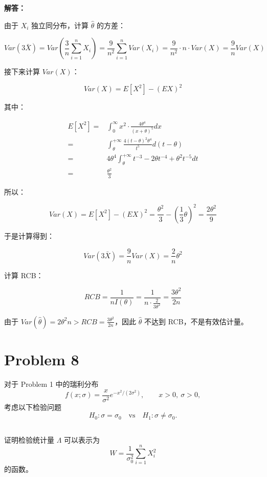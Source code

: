 \documentclass[12pt,a4paper]{article}
\begin{document}
\begin{answerbox}
\textbf{解答：}

由于 $X_i$ 独立同分布，计算 $\hat{\theta}$ 的方差：

$$
Var(3\bar{X}) = Var\left(\frac{3}{n}\sum_{i=1}^{n} X_i\right) = \frac{9}{n^2} \sum_{i=1}^{n} Var(X_i) = \frac{9}{n^2} \cdot n \cdot Var(X) = \frac{9}{n} Var(X)
$$

接下来计算 $Var(X)$：

$$
Var(X) = E[X^2] - (EX)^2
$$

其中：

$$
\begin{aligned}
E[X^2] =& \int_0^{\infty} x^2 \cdot \frac{4\theta^4}{(x+\theta)^5} dx \\
=& \int_{\theta}^{+\infty} \frac{4(t-\theta)^2\theta^4}{t^5} d(t-\theta) \\
=& 4\theta^4 \int_{\theta}^{+\infty} t^{-3} - 2\theta t^{-4} + \theta^2 t^{-5} dt \\
=& \frac{\theta^2}{3}
\end{aligned}
$$

所以：

$$
Var(X) = E[X^2] - (EX)^2 = \frac{\theta^2}{3} - \left(\frac{1}{3}\theta\right)^2 = \frac{2\theta^2}{9}
$$

于是计算得到：

$$
Var(3\bar{X}) = \frac{9}{n} Var(X) = \frac{2}{n} \theta^2
$$

计算 RCB：

$$
RCB = \frac{1}{nI(\theta)} = \frac{1}{n \cdot \frac{2}{3\theta^2}} = \frac{3\theta^2}{2n}
$$

由于 $Var(\hat{\theta}) = {2\theta^2}{n} > RCB = \frac{3\theta^2}{2n}$，因此 $\hat{\theta}$ 不达到 RCB，不是有效估计量。

\end{answerbox}


\section{Problem 8}
对于 Problem 1 中的瑞利分布
\[
  f(x;\sigma)=\frac{x}{\sigma^2}e^{-x^2/(2\sigma^2)},\qquad x>0,\ \sigma>0,
\]
考虑以下检验问题
\[
  H_0:\sigma=\sigma_0\quad \text{vs}\quad H_1:\sigma\ne\sigma_0.
\]

\subsection{}

证明检验统计量 $\Lambda$ 可以表示为
  \[
    W=\frac{1}{\sigma_0^2}\sum_{i=1}^{n}X_i^2
  \]
  的函数。
\end{document}

